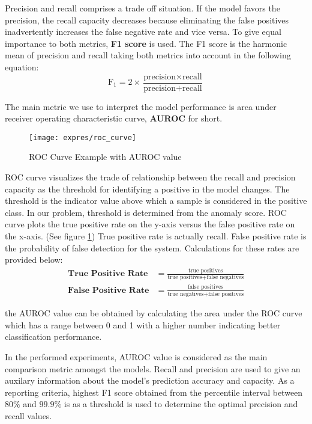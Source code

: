 Precision and recall comprises a trade off situation. If the model favors the precision, the recall capacity
decreases because eliminating the false positives inadvertently increases the false negative rate and 
vice versa. To give equal importance to both metrics, \textbf{F1 score} is used. The F1 score is the 
harmonic mean of precision and recall taking both metrics into account in the following equation:
\begin{equation}
\text{F}_{1} = 2 \times \frac{\text{precision} \times \text{recall}}{\text{precision} + \text{recall}}
\end{equation}

The main metric we use to interpret the model performance is area under receiver operating characteristic 
curve, \textbf{AUROC} for short. 
\begin{figure}[h!]%
	\centering
	\texttt{[image: expres/roc\_curve]}
	\caption{ROC Curve Example with AUROC value}
	\label{fig:roc_curve}%
\end{figure}
ROC curve visualizes the trade of relationship between the recall and precision capacity as the threshold for 
identifying a positive in the model changes. The threshold is the indicator value above which a sample is considered in the 
positive class. In our problem, threshold is determined from the anomaly score. ROC curve plots the true positive rate 
on the y-axis versus the false positive rate on the x-axis. (See figure \ref{fig:roc_curve})
True positive rate is actually recall. False positive rate is the probability of false detection for the system. 
Calculations for these rates are provided below:
\begin{align}
\textbf{True Positive Rate} & = \frac{\text{true positives}}{\text{true positives} + \text{false negatives}} \\[5pt]
\textbf{False Positive Rate} & = \frac{\text{false positives}}{\text{true negatives} + \text{false positives}}
\end{align}

the AUROC value can be obtained by calculating the area under the ROC curve which has a range between 0 and 1 
with a higher number indicating better classification performance.

In the performed experiments, AUROC value is considered as the main comparison metric amongst the models. 
Recall and precision are used to give an auxilary information about the model's prediction accuracy and capacity. 
As a reporting criteria, highest F1 score obtained from the percentile interval between $80\%$ and $99.9\%$ is 
as a threshold is used to determine the optimal precision and recall values. 

